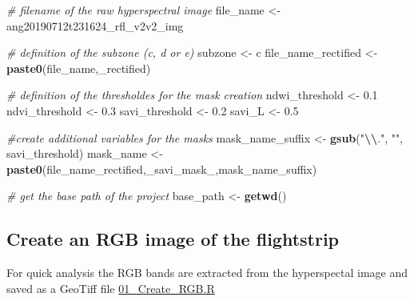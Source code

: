 \documentclass[
]{article}
\newenvironment{Shaded}{\begin{snugshade}}{\end{snugshade}}
\newcommand{\CommentTok}[1]{\textcolor[rgb]{0.56,0.35,0.01}{\textit{#1}}}
\newcommand{\FloatTok}[1]{\textcolor[rgb]{0.00,0.00,0.81}{#1}}
\newcommand{\FunctionTok}[1]{\textcolor[rgb]{0.13,0.29,0.53}{\textbf{#1}}}
\newcommand{\NormalTok}[1]{#1}
\newcommand{\OtherTok}[1]{\textcolor[rgb]{0.56,0.35,0.01}{#1}}
\newcommand{\SpecialCharTok}[1]{\textcolor[rgb]{0.81,0.36,0.00}{\textbf{#1}}}
\newcommand{\StringTok}[1]{\textcolor[rgb]{0.31,0.60,0.02}{#1}}
\begin{document}
\begin{Shaded}
\begin{Highlighting}[]

\CommentTok{\# filename of the raw hyperspectral image}
\NormalTok{file\_name }\OtherTok{\textless{}{-}} \StringTok{\textquotesingle{}ang20190712t231624\_rfl\_v2v2\_img\textquotesingle{}}

\CommentTok{\# definition of the subzone (c, d or e)}
\NormalTok{subzone }\OtherTok{\textless{}{-}} \StringTok{\textquotesingle{}c\textquotesingle{}}
\NormalTok{file\_name\_rectified }\OtherTok{\textless{}{-}} \FunctionTok{paste0}\NormalTok{(file\_name,}\StringTok{\textquotesingle{}\_rectified\textquotesingle{}}\NormalTok{)}

\CommentTok{\# definition of the thresholdes for the mask creation}
\NormalTok{ndwi\_threshold }\OtherTok{\textless{}{-}} \FloatTok{0.1}
\NormalTok{ndvi\_threshold }\OtherTok{\textless{}{-}} \FloatTok{0.3}
\NormalTok{savi\_threshold }\OtherTok{\textless{}{-}} \FloatTok{0.2}
\NormalTok{savi\_L }\OtherTok{\textless{}{-}} \FloatTok{0.5}

\CommentTok{\#create additional variables for the masks}
\NormalTok{mask\_name\_suffix }\OtherTok{\textless{}{-}} \FunctionTok{gsub}\NormalTok{(}\StringTok{"}\SpecialCharTok{\textbackslash{}\textbackslash{}}\StringTok{."}\NormalTok{, }\StringTok{""}\NormalTok{, savi\_threshold)}
\NormalTok{mask\_name }\OtherTok{\textless{}{-}} \FunctionTok{paste0}\NormalTok{(file\_name\_rectified,}\StringTok{\textquotesingle{}\_savi\_mask\_\textquotesingle{}}\NormalTok{,mask\_name\_suffix)}

\CommentTok{\# get the base path of the project}
\NormalTok{base\_path }\OtherTok{\textless{}{-}} \FunctionTok{getwd}\NormalTok{()}
\end{Highlighting}
\end{Shaded}

\subsection{Create an RGB image of the
flightstrip}\label{create-an-rgb-image-of-the-flightstrip}

For quick analysis the RGB bands are extracted from the hyperspectal
image and saved as a GeoTiff file
\href{https://github.com/patrickangst/UWW200_Master_Thesis_public/blob/main/MasterThesisRCode/01_Create_RGB.R}{01\_Create\_RGB.R}
\end{document}
